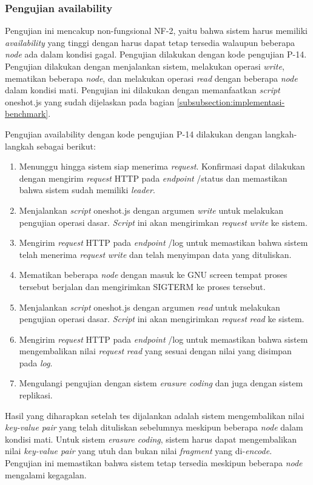 \subsubsection{Pengujian availability}
\label{subsubsection:pengujian-availability}

Pengujian ini mencakup non-fungsional NF-2, yaitu bahwa sistem harus memiliki \textit{availability} yang tinggi dengan harus dapat tetap tersedia walaupun beberapa \textit{node} ada dalam kondisi gagal. Pengujian dilakukan dengan kode pengujian P-14. Pengujian dilakukan dengan menjalankan sistem, melakukan operasi \textit{write}, mematikan beberapa \textit{node}, dan melakukan operasi \textit{read} dengan beberapa \textit{node} dalam kondisi mati. Pengujian ini dilakukan dengan memanfaatkan \textit{script} oneshot.js yang sudah dijelaskan pada bagian \ref{subsubsection:implementasi-benchmark}.

Pengujian availability dengan kode pengujian P-14 dilakukan dengan langkah-langkah sebagai berikut:
\begin{enumerate}
    \item Menunggu hingga sistem siap menerima \textit{request}. Konfirmasi dapat dilakukan dengan mengirim \textit{request} HTTP pada \textit{endpoint} /status dan memastikan bahwa sistem sudah memiliki \textit{leader}.
    \item Menjalankan \textit{script} oneshot.js dengan argumen \textit{write} untuk melakukan pengujian operasi dasar. \textit{Script} ini akan mengirimkan \textit{request} \textit{write} ke sistem.
    \item Mengirim \textit{request} HTTP pada \textit{endpoint} /log untuk memastikan bahwa sistem telah menerima \textit{request} \textit{write} dan telah menyimpan data yang dituliskan.
    \item Mematikan beberapa \textit{node} dengan masuk ke GNU screen tempat proses tersebut berjalan dan mengirimkan SIGTERM ke proses tersebut.
    \item Menjalankan \textit{script} oneshot.js dengan argumen \textit{read} untuk melakukan pengujian operasi dasar. \textit{Script} ini akan mengirimkan \textit{request} \textit{read} ke sistem.
    \item Mengirim \textit{request} HTTP pada \textit{endpoint} /log untuk memastikan bahwa sistem mengembalikan nilai \textit{request} \textit{read} yang sesuai dengan nilai yang disimpan pada \textit{log}.
    \item Mengulangi pengujian dengan sistem \textit{erasure coding} dan juga dengan sistem replikasi.
\end{enumerate}

Hasil yang diharapkan setelah tes dijalankan adalah sistem mengembalikan nilai \textit{key-value pair} yang telah dituliskan sebelumnya meskipun beberapa \textit{node} dalam kondisi mati. Untuk sistem \textit{erasure coding}, sistem harus dapat mengembalikan nilai \textit{key-value pair} yang utuh dan bukan nilai \textit{fragment} yang di-\textit{encode}. Pengujian ini memastikan bahwa sistem tetap tersedia meskipun beberapa \textit{node} mengalami kegagalan.